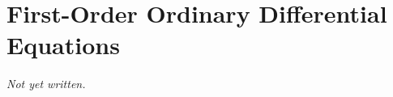 \chapter{First-Order Ordinary Differential Equations}\label{ch:first-order-odes}


\textit{Not yet written.}
